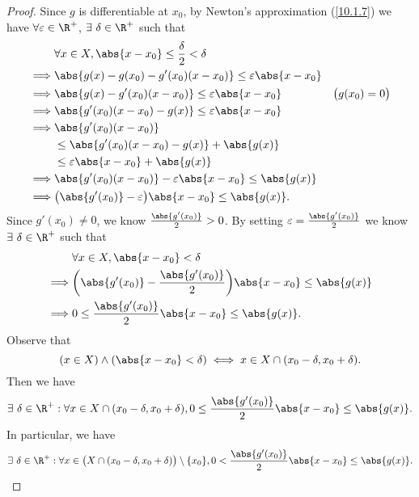 \begin{proof}
  Since \(g\) is differentiable at \(x_0\), by Newton's approximation (\cref{10.1.7}) we have \(\forall \varepsilon \in \R^+\), \(\exists\ \delta \in \R^+\) such that
  \begin{align*}
             & \forall x \in X, \abs{x - x_0} \leq \frac{\delta}{2} < \delta                                \\
    \implies & \abs{g(x) - g(x_0) - g'(x_0)(x - x_0)} \leq \varepsilon \abs{x - x_0}                        \\
    \implies & \abs{g(x) - g'(x_0)(x - x_0)} \leq \varepsilon \abs{x - x_0}          & \big(g(x_0) = 0\big) \\
    \implies & \abs{g'(x_0)(x - x_0) - g(x)} \leq \varepsilon \abs{x - x_0}                                 \\
    \implies & \abs{g'(x_0)(x - x_0)}                                                                       \\
             & \leq \abs{g'(x_0)(x - x_0) - g(x)} + \abs{g(x)}                                              \\
             & \leq \varepsilon \abs{x - x_0} + \abs{g(x)}                                                  \\
    \implies & \abs{g'(x_0)(x - x_0)} - \varepsilon \abs{x - x_0} \leq \abs{g(x)}                           \\
    \implies & \big(\abs{g'(x_0)} - \varepsilon\big)\abs{x - x_0} \leq \abs{g(x)}.
  \end{align*}
  Since \(g'(x_0) \neq 0\), we know \(\frac{\abs{g'(x_0)}}{2} > 0\).
  By setting \(\varepsilon = \frac{\abs{g'(x_0)}}{2}\) we know \(\exists\ \delta \in \R^+\) such that
  \begin{align*}
             & \forall x \in X, \abs{x - x_0} < \delta                                           \\
    \implies & \bigg(\abs{g'(x_0)} - \frac{\abs{g'(x_0)}}{2}\bigg) \abs{x - x_0} \leq \abs{g(x)} \\
    \implies & 0 \leq \frac{\abs{g'(x_0)}}{2} \abs{x - x_0} \leq \abs{g(x)}.
  \end{align*}
  Observe that
  \[
    (x \in X) \land (\abs{x - x_0} < \delta) \iff x \in X \cap (x_0 - \delta, x_0 + \delta).
  \]
  Then we have
  \[
    \exists\ \delta \in \R^+ : \forall x \in X \cap (x_0 - \delta, x_0 + \delta), 0 \leq \frac{\abs{g'(x_0)}}{2} \abs{x - x_0} \leq \abs{g(x)}.
  \]
  In particular, we have
  \[
    \exists\ \delta \in \R^+ : \forall x \in \big(X \cap (x_0 - \delta, x_0 + \delta)\big) \setminus \{x_0\}, 0 < \frac{\abs{g'(x_0)}}{2} \abs{x - x_0} \leq \abs{g(x)}.
\]
\end{proof}
